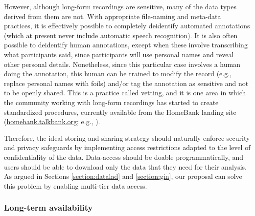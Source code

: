 \documentclass[smallextended]{svjour3}       %
\begin{document}
However, although  long-form recordings are sensitive, many of the data types derived from them are not. With appropriate file-naming and meta-data practices, it is effectively possible to completely deidentify automated annotations (which at present never include automatic speech recognition). It is also often possible to deidentify human annotations, except when these involve transcribing what participants said, since participants will use personal names and reveal other personal details. Nonetheless, since this particular case involves a human doing the annotation, this human can be trained to modify the record (e.g., replace personal names with foils) and/or tag the annotation as sensitive and not to be openly shared. This is a practice called vetting, and it is one area in which the community working with long-form recordings has started to create standardized procedures, currently available from the HomeBank landing site (\url{homebank.talkbank.org}; e.g., \citealt{vandam2018vetting}).

Therefore, the ideal storing-and-sharing strategy should naturally enforce security and privacy safeguards by implementing access restrictions adapted to the level of confidentiality of the data. Data-access should be doable programmatically, and users should be able to download only the data that they need for their analysis. As argued in Sections \ref{section:datalad} and \ref{section:gin}, our proposal can solve this problem by enabling multi-tier data access.

\subsubsection*{Long-term availability}
\end{document}
